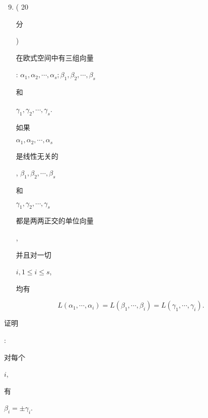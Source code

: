 \documentclass[10pt]{article}
\begin{document}
\begin{enumerate}
  \setcounter{enumi}{8}
  \item ( 20 \begin{CJK}{UTF8}{mj}分\end{CJK}) \begin{CJK}{UTF8}{mj}在欧式空间中有三组向量\end{CJK}: $\alpha_{1}, \alpha_{2}, \cdots, \alpha_{s} ; \beta_{1}, \beta_{2}, \cdots, \beta_{s}$ \begin{CJK}{UTF8}{mj}和\end{CJK} $\gamma_{1}, \gamma_{2}, \cdots, \gamma_{s}$. \begin{CJK}{UTF8}{mj}如果\end{CJK} $\alpha_{1}, \alpha_{2}, \cdots, \alpha_{s}$ \begin{CJK}{UTF8}{mj}是线性无关的\end{CJK}, $\beta_{1}, \beta_{2}, \cdots, \beta_{s}$ \begin{CJK}{UTF8}{mj}和\end{CJK} $\gamma_{1}, \gamma_{2}, \cdots, \gamma_{s}$ \begin{CJK}{UTF8}{mj}都是两两正交的单位向量\end{CJK}, \begin{CJK}{UTF8}{mj}并且对一切\end{CJK} $i, 1 \leq i \leq s$, \begin{CJK}{UTF8}{mj}均有\end{CJK}
\end{enumerate}
$$
L\left(\alpha_{1}, \cdots, \alpha_{i}\right)=L\left(\beta_{1}, \cdots, \beta_{i}\right)=L\left(\gamma_{1}, \cdots, \gamma_{i}\right) .
$$
\begin{CJK}{UTF8}{mj}证明\end{CJK}: \begin{CJK}{UTF8}{mj}对每个\end{CJK} $i$, \begin{CJK}{UTF8}{mj}有\end{CJK} $\beta_{i}=\pm \gamma_{i}$.
\end{document}
